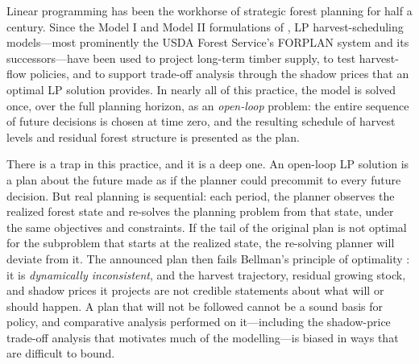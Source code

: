 \documentclass[12pt]{article}
\begin{document}
Linear programming has been the workhorse of strategic forest planning for half a century. Since the Model I and Model II formulations of \citet{johnson1977techniques}, LP harvest-scheduling models---most prominently the USDA Forest Service's FORPLAN system and its successors---have been used to project long-term timber supply, to test harvest-flow policies, and to support trade-off analysis through the shadow prices that an optimal LP solution provides. In nearly all of this practice, the model is solved once, over the full planning horizon, as an \emph{open-loop} problem: the entire sequence of future decisions is chosen at time zero, and the resulting schedule of harvest levels and residual forest structure is presented as the plan.

There is a trap in this practice, and it is a deep one. An open-loop LP solution is a plan about the future made as if the planner could precommit to every future decision. But real planning is sequential: each period, the planner observes the realized forest state and re-solves the planning problem from that state, under the same objectives and constraints. If the tail of the original plan is not optimal for the subproblem that starts at the realized state, the re-solving planner will deviate from it. The announced plan then fails Bellman's principle of optimality \citep{bellman1957dynamic}: it is \emph{dynamically inconsistent}, and the harvest trajectory, residual growing stock, and shadow prices it projects are not credible statements about what will or should happen. A plan that will not be followed cannot be a sound basis for policy, and comparative analysis performed on it---including the shadow-price trade-off analysis that motivates much of the modelling---is biased in ways that are difficult to bound.
\end{document}
